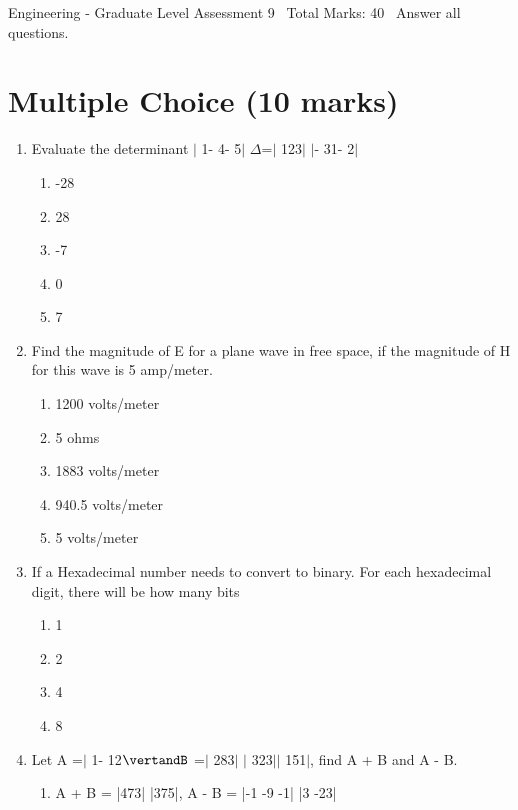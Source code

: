 \documentclass[12pt]{article}
\begin{document}
\begin{center}
Engineering - Graduate Level Assessment 9 \
Total Marks: 40 \
Answer all questions.
\end{center}

\section*{Multiple Choice (10 marks)}
\begin{enumerate}[label=\arabic*.]
\item Evaluate the determinant \ensuremath{\vert} 1- 4- 5\ensuremath{\vert} \ensuremath{\Delta}=\ensuremath{\vert} 123\ensuremath{\vert} \ensuremath{\vert}- 31- 2\ensuremath{\vert}
\begin{enumerate}[label=(\alph*)]
    \item -28
    \item 28
    \item -7
    \item 0
    \item 7
\end{enumerate}
\item Find the magnitude of E for a plane wave in free space, if the magnitude of H for this wave is 5 amp/meter.
\begin{enumerate}[label=(\alph*)]
    \item 1200 volts/meter
    \item 5 ohms
    \item 1883 volts/meter
    \item 940.5 volts/meter
    \item 5 volts/meter
\end{enumerate}
\item If a Hexadecimal number needs to convert to binary. For each hexadecimal digit, there will be how many bits
\begin{enumerate}[label=(\alph*)]
    \item 1
    \item 2
    \item 4
    \item 8
\end{enumerate}
\item Let A =\ensuremath{\vert} 1- 12\ensuremath{\vertandB} =\ensuremath{\vert} 283\ensuremath{\vert} \ensuremath{\vert} 323\ensuremath{\vert}\ensuremath{\vert} 151\ensuremath{\vert}, find A + B and A - B.
\begin{enumerate}[label=(\alph*)]
    \item A + B = |473| |375|, A - B = |-1 -9 -1| |3 -23|

\end{enumerate}
\end{enumerate}
\end{document}
